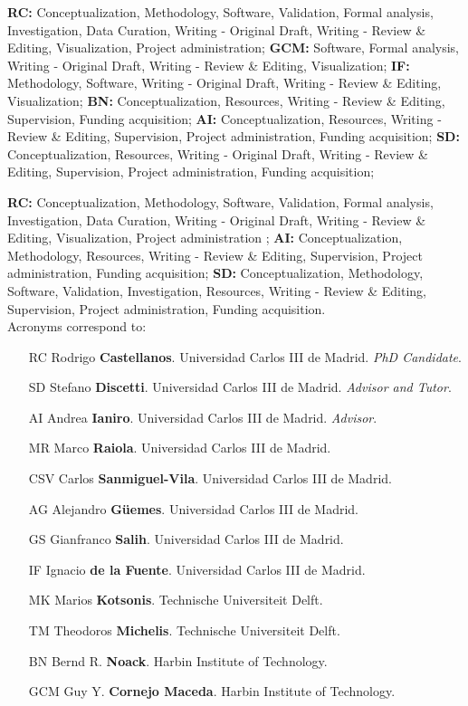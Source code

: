 \paperitem %
	\textbf{RC:} Conceptualization, Methodology, Software, Validation, Formal analysis, Investigation, Data Curation, Writing - Original Draft, Writing - Review \& Editing, Visualization, Project administration;
	\textbf{GCM:} Software, Formal analysis, Writing - Original Draft, Writing - Review \& Editing, Visualization;
	\textbf{IF:} Methodology, Software, Writing - Original Draft, Writing - Review \& Editing, Visualization;
	\textbf{BN:} Conceptualization, Resources, Writing - Review \& Editing, Supervision, Funding acquisition;
	\textbf{AI:} Conceptualization, Resources, Writing - Review \& Editing, Supervision, Project administration, Funding acquisition;
	\textbf{SD:} Conceptualization, Resources, Writing - Original Draft, Writing - Review \& Editing, Supervision, Project administration, Funding acquisition;
		
\paperitem %
	\textbf{RC:} Conceptualization, Methodology, Software, Validation, Formal analysis, Investigation, Data Curation, Writing - Original Draft, Writing - Review \& Editing,
Visualization, Project administration ;
	\textbf{AI:} Conceptualization, Methodology, Resources, Writing - Review \&
Editing, Supervision, Project administration, Funding acquisition;
	\textbf{SD:} Conceptualization, Methodology, Software, Validation, Investigation, Resources, Writing - Review \& Editing, Supervision, Project administration, Funding acquisition.\\%

\vspace{1cm}
\noindent Acronyms correspond to:
\begin{itemize}
    \item[RC] Rodrigo \textbf{Castellanos}. Universidad Carlos III de Madrid. \small{\textit{PhD Candidate}}.
    \item[SD] Stefano \textbf{Discetti}. Universidad Carlos III de Madrid. \small{\textit{Advisor and Tutor}}. 
    \item[AI] Andrea \textbf{Ianiro}. Universidad Carlos III de Madrid. \small{\textit{Advisor}}.
    \item[MR] Marco \textbf{Raiola}. Universidad Carlos III de Madrid.
    \item[CSV] Carlos \textbf{Sanmiguel-Vila}. Universidad Carlos III de Madrid.
    \item[AG] Alejandro \textbf{G\"uemes}. Universidad Carlos III de Madrid.
    \item[GS] Gianfranco \textbf{Salih}. Universidad Carlos III de Madrid.
    \item[IF] Ignacio \textbf{de la Fuente}. Universidad Carlos III de Madrid.
    \item[MK] Marios \textbf{Kotsonis}. Technische Universiteit Delft.
    \item[TM] Theodoros \textbf{Michelis}. Technische Universiteit Delft.
    \item[BN] Bernd R. \textbf{Noack}. Harbin Institute of Technology.
    \item[GCM] Guy Y. \textbf{Cornejo Maceda}. Harbin Institute of Technology.
\end{itemize}


